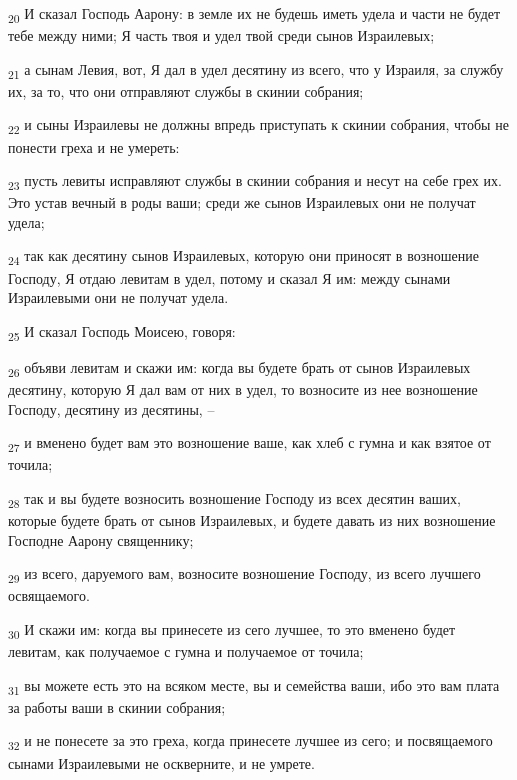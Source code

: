 \begin{tcolorbox}
\textsubscript{20} И сказал Господь Аарону: в земле их не будешь иметь удела и части не будет тебе между ними; Я часть твоя и удел твой среди сынов Израилевых;
\end{tcolorbox}
\begin{tcolorbox}
\textsubscript{21} а сынам Левия, вот, Я дал в удел десятину из всего, что у Израиля, за службу их, за то, что они отправляют службы в скинии собрания;
\end{tcolorbox}
\begin{tcolorbox}
\textsubscript{22} и сыны Израилевы не должны впредь приступать к скинии собрания, чтобы не понести греха и не умереть:
\end{tcolorbox}
\begin{tcolorbox}
\textsubscript{23} пусть левиты исправляют службы в скинии собрания и несут на себе грех их. Это устав вечный в роды ваши; среди же сынов Израилевых они не получат удела;
\end{tcolorbox}
\begin{tcolorbox}
\textsubscript{24} так как десятину сынов Израилевых, которую они приносят в возношение Господу, Я отдаю левитам в удел, потому и сказал Я им: между сынами Израилевыми они не получат удела.
\end{tcolorbox}
\begin{tcolorbox}
\textsubscript{25} И сказал Господь Моисею, говоря:
\end{tcolorbox}
\begin{tcolorbox}
\textsubscript{26} объяви левитам и скажи им: когда вы будете брать от сынов Израилевых десятину, которую Я дал вам от них в удел, то возносите из нее возношение Господу, десятину из десятины, --
\end{tcolorbox}
\begin{tcolorbox}
\textsubscript{27} и вменено будет вам это возношение ваше, как хлеб с гумна и как взятое от точила;
\end{tcolorbox}
\begin{tcolorbox}
\textsubscript{28} так и вы будете возносить возношение Господу из всех десятин ваших, которые будете брать от сынов Израилевых, и будете давать из них возношение Господне Аарону священнику;
\end{tcolorbox}
\begin{tcolorbox}
\textsubscript{29} из всего, даруемого вам, возносите возношение Господу, из всего лучшего освящаемого.
\end{tcolorbox}
\begin{tcolorbox}
\textsubscript{30} И скажи им: когда вы принесете из сего лучшее, то это вменено будет левитам, как получаемое с гумна и получаемое от точила;
\end{tcolorbox}
\begin{tcolorbox}
\textsubscript{31} вы можете есть это на всяком месте, вы и семейства ваши, ибо это вам плата за работы ваши в скинии собрания;
\end{tcolorbox}
\begin{tcolorbox}
\textsubscript{32} и не понесете за это греха, когда принесете лучшее из сего; и посвящаемого сынами Израилевыми не оскверните, и не умрете.
\end{tcolorbox}
